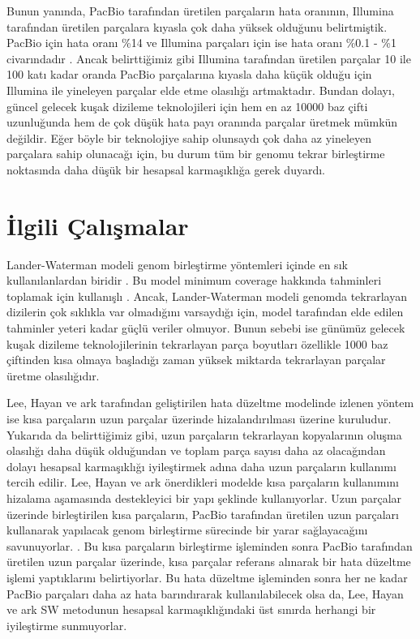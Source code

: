 Bunun yanında, PacBio tarafından üretilen parçaların hata oranının, Illumina tarafından üretilen parçalara kıyasla çok daha yüksek olduğunu belirtmiştik. PacBio için hata oranı \%14 \cite{pacbioerr} ve Illumina parçaları için ise hata oranı \%0.1 - \%1 civarındadır \cite{Lou2013}. Ancak belirttiğimiz gibi Illumina tarafından üretilen parçalar 10 ile 100 katı kadar oranda PacBio parçalarına kıyasla daha küçük olduğu için Illumina ile yineleyen parçalar elde etme olasılığı artmaktadır. Bundan dolayı, güncel gelecek kuşak dizileme teknolojileri için hem en az 10000 baz çifti uzunluğunda hem de çok düşük hata payı oranında parçalar üretmek mümkün değildir. Eğer böyle bir teknolojiye sahip olunsaydı çok daha az yineleyen parçalara sahip olunacağı için, bu durum tüm bir genomu tekrar birleştirme noktasında daha düşük bir hesapsal karmaşıklığa gerek duyardı. 

\section{İlgili Çalışmalar}

Lander-Waterman modeli genom birleştirme yöntemleri içinde en sık kullanılanlardan biridir \cite{Lander1988}. Bu model minimum coverage hakkında tahminleri toplamak için kullanışlı \cite{Lee2014}. Ancak, Lander-Waterman modeli genomda tekrarlayan dizilerin çok sıklıkla var olmadığını varsaydığı için, model tarafından elde edilen tahminler yeteri kadar güçlü veriler olmuyor. Bunun sebebi ise günümüz gelecek kuşak dizileme teknolojilerinin tekrarlayan parça boyutları özellikle 1000 baz çiftinden kısa olmaya başladığı zaman yüksek miktarda tekrarlayan parçalar üretme olasılığıdır.

Lee, Hayan ve ark \cite{Lee2014} tarafından geliştirilen hata düzeltme modelinde izlenen yöntem ise kısa parçaların uzun parçalar üzerinde hizalandırılması üzerine kuruludur. Yukarıda da belirttiğimiz gibi, uzun parçaların tekrarlayan kopyalarının oluşma olasılığı daha düşük olduğundan ve toplam parça sayısı daha az olacağından dolayı hesapsal karmaşıklığı iyileştirmek adına daha uzun parçaların kullanımı tercih edilir. Lee, Hayan ve ark önerdikleri modelde kısa parçaların kullanımını hizalama aşamasında destekleyici bir yapı şeklinde kullanıyorlar. Uzun parçalar üzerinde birleştirilen kısa parçaların, PacBio tarafından üretilen uzun parçaları kullanarak yapılacak genom birleştirme sürecinde bir yarar sağlayacağını savunuyorlar. \cite{Lee2014}. Bu kısa parçaların birleştirme işleminden sonra PacBio tarafından üretilen uzun parçalar üzerinde, kısa parçalar referans alınarak bir hata düzeltme işlemi yaptıklarını belirtiyorlar. Bu hata düzeltme işleminden sonra her ne kadar PacBio parçaları daha az hata barındırarak kullanılabilecek olsa da, Lee, Hayan ve ark SW metodunun hesapsal karmaşıklığındaki üst sınırda herhangi bir iyileştirme sunmuyorlar.

